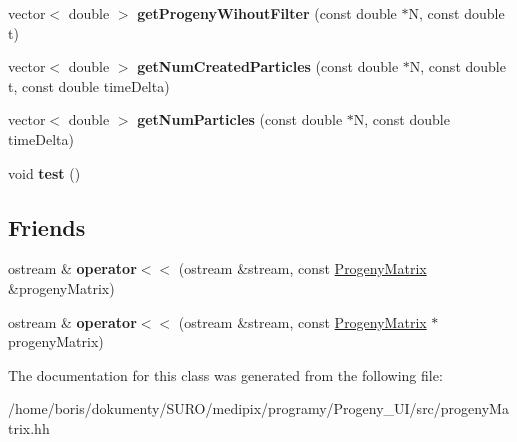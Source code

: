 \begin{DoxyCompactItemize}
\item 
\hypertarget{classProgenyMatrix_adc511e5bb07ef655fb085b31232072b6}{vector$<$ double $>$ {\bfseries get\+Progeny\+Wihout\+Filter} (const double $\ast$N, const double t)}\label{classProgenyMatrix_adc511e5bb07ef655fb085b31232072b6}

\item 
\hypertarget{classProgenyMatrix_af7c7f969cd87add705bd2a6aa1bf323d}{vector$<$ double $>$ {\bfseries get\+Num\+Created\+Particles} (const double $\ast$N, const double t, const double time\+Delta)}\label{classProgenyMatrix_af7c7f969cd87add705bd2a6aa1bf323d}

\item 
\hypertarget{classProgenyMatrix_a9420c56c7afbb8950822da28ab7249c9}{vector$<$ double $>$ {\bfseries get\+Num\+Particles} (const double $\ast$N, const double time\+Delta)}\label{classProgenyMatrix_a9420c56c7afbb8950822da28ab7249c9}

\item 
\hypertarget{classProgenyMatrix_a610583b083ef3a46ff2471d4ab06412e}{void {\bfseries test} ()}\label{classProgenyMatrix_a610583b083ef3a46ff2471d4ab06412e}

\end{DoxyCompactItemize}
\subsection*{Friends}
\begin{DoxyCompactItemize}
\item 
\hypertarget{classProgenyMatrix_ab98de18a4e21a01349e72a4a5ebfef6d}{ostream \& {\bfseries operator$<$$<$} (ostream \&stream, const \hyperlink{classProgenyMatrix}{Progeny\+Matrix} \&progeny\+Matrix)}\label{classProgenyMatrix_ab98de18a4e21a01349e72a4a5ebfef6d}

\item 
\hypertarget{classProgenyMatrix_a849973a8862cb5f5343512e200fe2687}{ostream \& {\bfseries operator$<$$<$} (ostream \&stream, const \hyperlink{classProgenyMatrix}{Progeny\+Matrix} $\ast$progeny\+Matrix)}\label{classProgenyMatrix_a849973a8862cb5f5343512e200fe2687}

\end{DoxyCompactItemize}


The documentation for this class was generated from the following file\+:\begin{DoxyCompactItemize}
\item 
/home/boris/dokumenty/\+S\+U\+R\+O/medipix/programy/\+Progeny\+\_\+\+U\+I/src/progeny\+Matrix.\+hh\end{DoxyCompactItemize}
